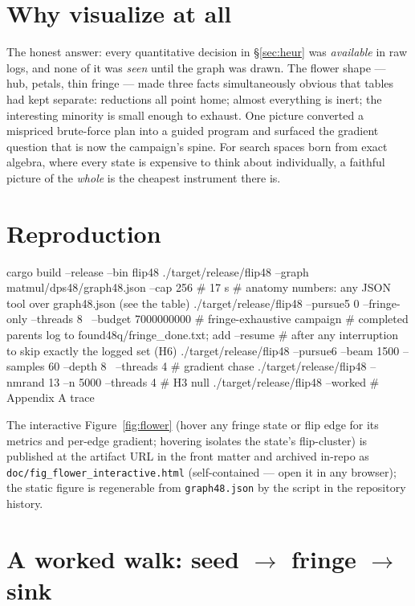 \documentclass[10pt]{article}
\begin{document}
\section{Why visualize at all}\label{sec:why}

The honest answer: every quantitative decision in \S\ref{sec:heur}
was \emph{available} in raw logs, and none of it was \emph{seen} until
the graph was drawn. The flower shape --- hub, petals, thin fringe ---
made three facts simultaneously obvious that tables had kept separate:
reductions all point home; almost everything is inert; the interesting
minority is small enough to exhaust. One picture converted a mispriced
brute-force plan into a guided program and surfaced the gradient
question that is now the campaign's spine. For search spaces born from
exact algebra, where every state is expensive to think about
individually, a faithful picture of the \emph{whole} is the cheapest
instrument there is.

\section{Reproduction}\label{sec:repro}

\begin{Code}
cargo build --release --bin flip48
./target/release/flip48 --graph matmul/dps48/graph48.json --cap 256   # 17 s
# anatomy numbers: any JSON tool over graph48.json (see the table)
./target/release/flip48 --pursue5 0 --fringe-only --threads 8 \
    --budget 7000000000            # fringe-exhaustive campaign
# completed parents log to found48q/fringe_done.txt; add --resume
# after any interruption to skip exactly the logged set (H6)
./target/release/flip48 --pursue6 --beam 1500 --samples 60 --depth 8 \
    --threads 4                    # gradient chase
./target/release/flip48 --nmrand 13 --n 5000 --threads 4   # H3 null
./target/release/flip48 --worked                 # Appendix A trace
\end{Code}

The interactive Figure~\ref{fig:flower} (hover any fringe state or
flip edge for its metrics and per-edge gradient; hovering isolates
the state's flip-cluster) is published at the artifact URL in the
front matter and
archived in-repo as \texttt{doc/fig\_flower\_interactive.html}
(self-contained --- open it in any browser); the static figure is
regenerable from \texttt{graph48.json} by the script in the
repository history.

\appendix
\section{A worked walk: seed $\to$ fringe $\to$ sink}\label{app:walk}
\end{document}
